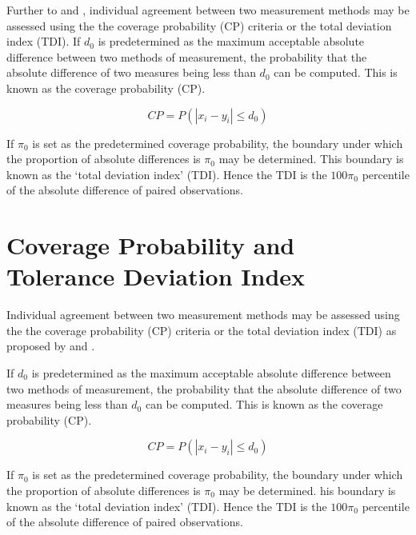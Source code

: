 \documentclass[12pt, a4paper]{report}
\theoremstyle{plain}
\theoremstyle{definition}
\theoremstyle{remark}
\begin{document}
	Further to  \citet{lin2000} and \citet{lin2002}, individual agreement between two measurement methods may be
	assessed using the the coverage probability (CP) criteria or the total deviation index (TDI). If $d_{0}$ is predetermined as the maximum acceptable absolute difference between two methods of measurement, the probability that the absolute difference of two measures being less than $d_{0}$ can be computed. This is known as the coverage probability (CP).
	
	\begin{equation}
	CP = P(|x_{i} - y_{i}| \leq d_{0})
	\end{equation}
	
	If $\pi_{0}$ is set as the predetermined coverage probability, the
	boundary under which the proportion of absolute differences is
	$\pi_{0}$ may be determined. This boundary is known as the `total
	deviation index' (TDI). Hence the TDI is the $100\pi_{0}$
	percentile of the absolute difference of paired observations.
	


\section{Coverage Probability and Tolerance Deviation Index}

Individual agreement between two measurement methods may be
assessed using the the coverage probability (CP) criteria or the
total deviation index (TDI) as proposed by \citet{lin2000} and
\citet{lin2002}.

If $d_{0}$ is predetermined as the maximum acceptable absolute
difference between two methods of measurement, the probability
that the absolute difference of two measures being less than
$d_{0}$ can be computed. This is known as the coverage probability
(CP).

\begin{equation}
CP = P(|x_{i} - y_{i}| \leq d_{0})
\end{equation}

If $\pi_{0}$ is set as the predetermined coverage probability, the
boundary under which the proportion of absolute differences is
$\pi_{0}$ may be determined. his boundary is known as the `total
deviation index' (TDI). Hence the TDI is the $100\pi_{0}$
percentile of the absolute difference of paired observations.
\end{document}
